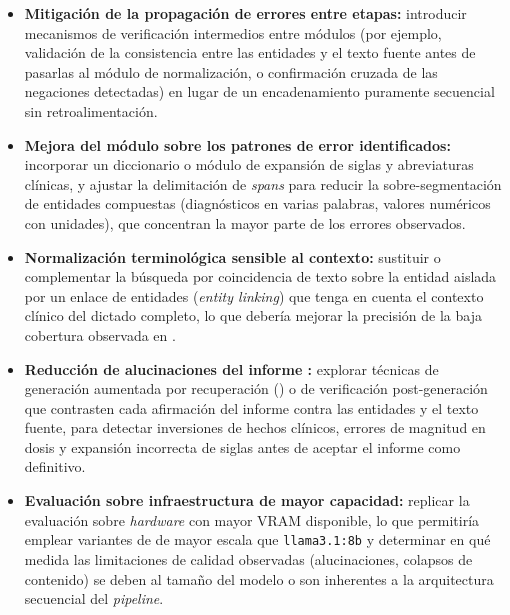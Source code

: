 \begin{itemize}
    \item \textbf{Mitigación de la propagación de errores entre etapas:} introducir mecanismos de
    verificación intermedios entre módulos (por ejemplo, validación de la consistencia entre las
    entidades  y el texto fuente antes de pasarlas al módulo de normalización, o
    confirmación cruzada de las negaciones detectadas) en lugar de un encadenamiento puramente
    secuencial sin retroalimentación.

    \item \textbf{Mejora del módulo  sobre los patrones de error identificados:}
    incorporar un diccionario o módulo de expansión de siglas y abreviaturas clínicas, y ajustar la
    delimitación de \textit{spans} para reducir la sobre-segmentación de entidades compuestas
    (diagnósticos en varias palabras, valores numéricos con unidades), que concentran la mayor parte
    de los errores observados.

    \item \textbf{Normalización terminológica sensible al contexto:} sustituir o complementar la
    búsqueda por coincidencia de texto sobre la entidad aislada por un enlace de entidades
    (\textit{entity linking}) que tenga en cuenta el contexto clínico del dictado completo, lo que
    debería mejorar la precisión de la baja cobertura observada en .

    \item \textbf{Reducción de alucinaciones del informe :} explorar técnicas de
    generación aumentada por recuperación () o de verificación post-generación que
    contrasten cada afirmación del informe contra las entidades y el texto fuente, para detectar
    inversiones de hechos clínicos, errores de magnitud en dosis y expansión incorrecta de siglas
    antes de aceptar el informe como definitivo.

    \item \textbf{Evaluación sobre infraestructura de mayor capacidad:} replicar la evaluación
     sobre \textit{hardware} con mayor VRAM disponible, lo que permitiría
    emplear variantes de  de mayor escala que \texttt{llama3.1:8b} y determinar en
    qué medida las limitaciones de calidad observadas (alucinaciones, colapsos de contenido) se deben
    al tamaño del modelo o son inherentes a la arquitectura secuencial del \textit{pipeline}.
\end{itemize}
